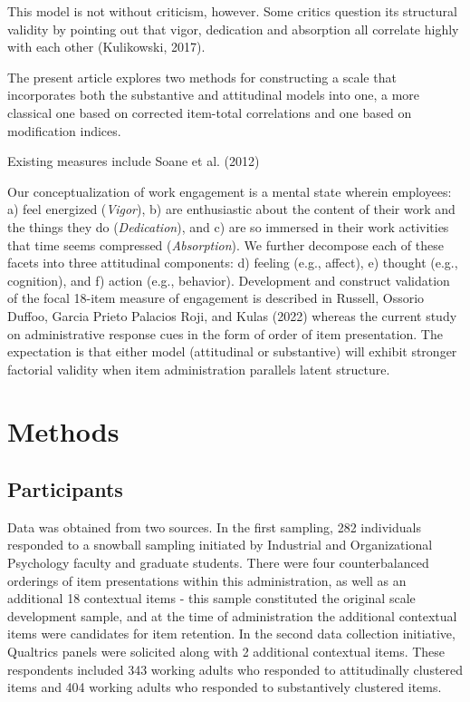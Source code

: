 \documentclass[
  english,
  man]{apa6}
\begin{document}
This model is not without criticism, however. Some critics question its structural validity by pointing out that vigor, dedication and absorption all correlate highly with each other (Kulikowski, 2017).

The present article explores two methods for constructing a scale that incorporates both the substantive and attitudinal models into one, a more classical one based on corrected item-total correlations and one based on modification indices.

Existing measures include Soane et al. (2012)

Our conceptualization of work engagement is a mental state wherein employees: a) feel energized (\emph{Vigor}), b) are enthusiastic about the content of their work and the things they do (\emph{Dedication}), and c) are so immersed in their work activities that time seems compressed (\emph{Absorption}). We further decompose each of these facets into three attitudinal components: d) feeling (e.g., affect), e) thought (e.g., cognition), and f) action (e.g., behavior). Development and construct validation of the focal 18-item measure of engagement is described in Russell, Ossorio Duffoo, Garcia Prieto Palacios Roji, and Kulas (2022) whereas the current study on administrative response cues in the form of order of item presentation. The expectation is that either model (attitudinal or substantive) will exhibit stronger factorial validity when item administration parallels latent structure.

\hypertarget{methods}{%
\section{Methods}\label{methods}}

\hypertarget{participants}{%
\subsection{Participants}\label{participants}}

Data was obtained from two sources. In the first sampling, 282 individuals responded to a snowball sampling initiated by Industrial and Organizational Psychology faculty and graduate students. There were four counterbalanced orderings of item presentations within this administration, as well as an additional 18 contextual items - this sample constituted the original scale development sample, and at the time of administration the additional contextual items were candidates for item retention. In the second data collection initiative, Qualtrics panels were solicited along with 2 additional contextual items. These respondents included 343 working adults who responded to attitudinally clustered items and 404 working adults who responded to substantively clustered items.
\end{document}
